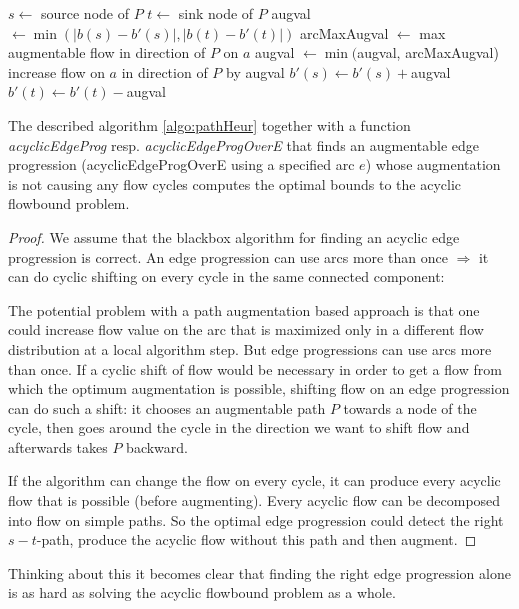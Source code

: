 \begin{algorithm}
 \begin{algorithmic}
    \State $s \gets $ source node of $P$
    \State $t \gets $ sink node of $P$
    \State augval $\gets \min(|b(s)-b'(s)|,|b(t)-b'(t)|)$
      \State arcMaxAugval $\gets$ max augmentable flow in direction of $P$ on $a$ 
      \State augval $\gets \min($augval, arcMaxAugval)
    \EndFor
      \State increase flow on $a$ in direction of $P$ by augval
    \EndFor
    \State $b'(s) \gets b'(s) + $augval
    \State $b'(t) \gets b'(t) - $augval
  \EndFunction
 \end{algorithmic}
\end{algorithm}

\begin{prop}
 The described algorithm \ref{algo:pathHeur} together with a function \textit{acyclicEdgeProg} 
 resp. \textit{acyclicEdgeProgOverE} 
 that finds an augmentable edge progression (acyclicEdgeProgOverE using a specified arc $e$)
 whose augmentation is not causing any flow cycles computes the optimal bounds to the acyclic flowbound problem. 
\end{prop}
\begin{proof}
 We assume that the blackbox algorithm for finding an acyclic edge progression is correct. An edge progression can use
 arcs more than once $\Rightarrow$ it can do cyclic shifting on every cycle in the same connected component: 
 
 The potential problem with a path augmentation based approach is that one could increase flow value on the 
 arc that is maximized only in a different flow distribution at a local algorithm step. But edge progressions can use 
 arcs more than once. 
 If a cyclic shift of flow would be necessary in order to get a flow from which the optimum augmentation is possible, 
 shifting flow on an edge progression can do such a shift: it chooses an augmentable path $P$ towards a node of the cycle,
 then goes around the cycle in the direction we want to shift flow and afterwards takes $P$ backward. 
 
 If the algorithm can change the flow on every cycle, it can produce every acyclic flow that is possible (before augmenting).
 Every acyclic flow can be  decomposed into flow on simple paths. 
 So the optimal edge progression could detect the right  $s-t$-path, produce the  acyclic flow without this path and then augment. 
   
\end{proof}
Thinking about this it becomes clear that finding the right edge progression alone is as hard as solving the acyclic 
flowbound problem as a whole. 

